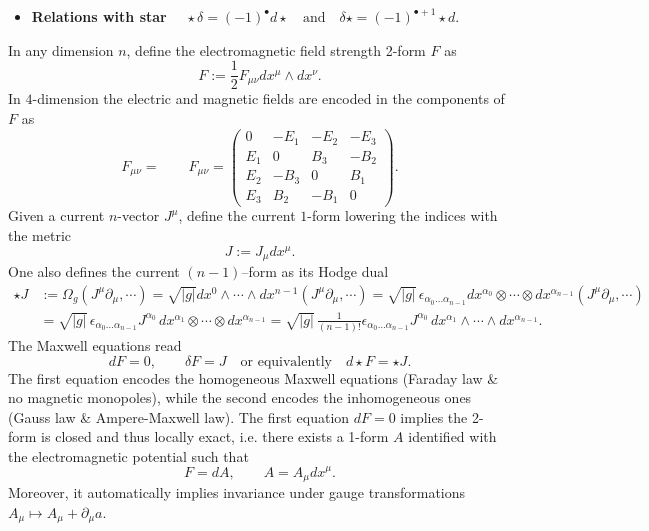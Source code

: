 \begin{mytheorem}
\begin{itemize}
    \item \textbf{Relations with star} {$\quad \displaystyle\star \delta = (-1)^{\bullet} d \star \quad \text{and} \quad \delta \star = (-1)^{\bullet +1} \star d.$}
\end{itemize}

\end{mytheorem}


\begin{mytheorem}
In any dimension $n$, define the electromagnetic field strength 2-form \(F\) as
\begin{equation}
    F := \frac{1}{2} F_{\mu \nu} dx^{\mu} \wedge dx^{\nu}.
\end{equation}
In $4$-dimension the electric and magnetic fields are encoded in the components of $F$ as
\begin{equation}
    F_{\mu \nu} = \qquad F_{\mu\nu} = \begin{pmatrix}
    0 & -E_1 & -E_2 & -E_3 \\
    E_1 & 0 & B_3 & -B_2 \\
    E_2 & -B_3 & 0 & B_1 \\
    E_3 & B_2 & -B_1 & 0
    \end{pmatrix}.
\end{equation}
%
Given a current $n$-vector $J^\mu$, define the current $1$-form lowering the indices with the metric
\begin{equation}
    J := J_{\mu} dx^{\mu}.
\end{equation}
One also defines the current $(n-1)$--form as its Hodge dual
{\small
\begin{align}
    \star J &:= \Omega_g(J^\mu \partial_\mu,\cdots)= \sqrt{|g|}dx^0\wedge \cdots \wedge dx^{n-1} (J^\mu \partial_\mu,\cdots) 
    = \sqrt{|g|}\,\epsilon_{\alpha_0\dots \alpha_{n-1}} dx^{\alpha_0} \otimes \cdots \otimes dx^{\alpha_{n-1}} (J^\mu \partial_\mu,\cdots)
    \\
    &=  \sqrt{|g|}\,\epsilon_{\alpha_0\dots \alpha_{n-1}} J^{\alpha_0}\, dx^{\alpha_1} \otimes \cdots \otimes dx^{\alpha_{n-1}} 
    = \sqrt{|g|}\,\frac{1}{(n-1)!}\epsilon_{\alpha_0\dots \alpha_{n-1}} J^{\alpha_0}\, dx^{\alpha_1} \wedge \cdots \wedge dx^{\alpha_{n-1}}.
\end{align}
}
%
The Maxwell equations read
\begin{equation}
    dF = 0, \qquad \delta F = J \quad \text{or equivalently} \quad d \star F = \star J.
\end{equation}
The first equation encodes the homogeneous Maxwell equations (Faraday law \& no magnetic monopoles), while the second encodes the inhomogeneous ones (Gauss law \& Ampere-Maxwell law).
The first equation \(dF=0\) implies the 2-form is closed and thus locally exact, i.e. there exists a 1-form $A$ identified with the electromagnetic potential such that
\begin{equation}
    F = dA,\qquad A = A_{\mu} dx^{\mu}.
\end{equation}
Moreover, it automatically implies invariance under gauge transformations $A_\mu\mapsto A_\mu + \partial_\mu a$.
\end{mytheorem}
